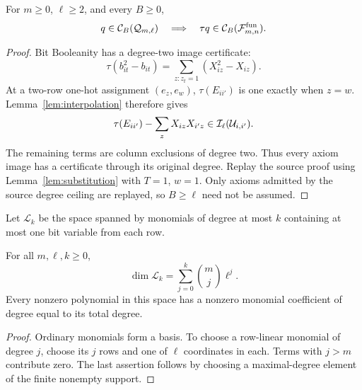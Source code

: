 \begin{lemma}\label{lem:decoder}
For \(m\ge0\), \(\ell\ge2\), and every \(B\ge0\),
\[
 q\in\mathcal C_B(\mathcal Q_{m,\ell})
 \quad\Longrightarrow\quad
 \tau q\in\mathcal C_B(\mathcal F^{\mathrm{fun}}_{m,n}).
\]
\end{lemma}
\begin{proof}
Bit Booleanity has a degree-two image certificate:
\[
 \tau(b_{it}^2-b_{it})=\sum_{z:z_t=1}(X_{iz}^2-X_{iz}).
\]
At a two-row one-hot assignment \((e_z,e_w)\), \(\tau(E_{ii'})\)
is one exactly when \(z=w\). Lemma~\ref{lem:interpolation} therefore gives
\[
 \tau(E_{ii'})-\sum_zX_{iz}X_{i'z}
       \in\mathcal I_\ell(\mathcal U_{i,i'}).
\]
The remaining terms are column exclusions of degree two. Thus every axiom
image has a certificate through its original degree. Replay the source
proof using Lemma~\ref{lem:substitution} with \(T=1\), \(w=1\).
Only axioms admitted by the source degree ceiling are replayed, so
\(B\ge\ell\) need not be assumed.
\end{proof}


Let \(\mathcal L_k\) be the space spanned by monomials of degree at most
\(k\) containing at most one bit variable from each row.

\begin{lemma}\label{lem:row-dimension}
For all \(m,\ell,k\ge0\),
\begin{equation}\label{eq:row-linear-dimension}
 \dim\mathcal L_k=\sum_{j=0}^k\binom mj\ell^j.
\end{equation}
Every nonzero polynomial in this space has a nonzero monomial coefficient
of degree equal to its total degree.
\end{lemma}
\begin{proof}
Ordinary monomials form a basis. To choose a row-linear monomial of degree
\(j\), choose its \(j\) rows and one of \(\ell\) coordinates in each.
Terms with \(j>m\) contribute zero. The last assertion follows by choosing
a maximal-degree element of the finite nonempty support.
\end{proof}

